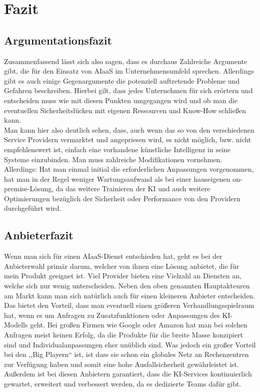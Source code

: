 \newpage
\section{Fazit}
\subsection{Argumentationsfazit}
Zusammenfassend lässt sich also sagen, dass es durchaus Zahlreiche Argumente gibt, die für den Einsatz von AIaaS im Unternehmensumfeld sprechen. Allerdings gibt es auch einige Gegenargumente die potenziell auftretende Probleme und Gefahren beschreiben. Hierbei gilt, dass jedes Unternehmen für sich erörtern und entscheiden muss wie mit diesen Punkten umgegangen wird und ob man die eventuellen Sicherheitslücken mit eigenen Ressourcen und Know-How schließen kann. \\
Man kann hier also deutlich sehen, dass, auch wenn das so von den verschiedenen Service Providern vermarktet und angepriesen wird, es nicht möglich, bzw. nicht empfehlenswert ist, einfach eine vorhandene künstliche Intelligenz in seine Systeme einzubinden. Man muss zahlreiche Modifikationen vornehmen. Allerdings: Hat man einmal initial die erforderlichen Anpassungen vorgenommen, hat man in der Regel weniger Wartungsaufwand als bei einer hauseigenen on-premise-Lösung, da das weitere Trainieren der KI und auch weitere Optimierungen bezüglich der Sicherheit oder Performance von den Providern durchgeführt wird. \\

\subsection{Anbieterfazit}
Wenn man sich für einen AIaaS-Dienst entschieden hat, geht es bei der Anbieterwahl primär darum, welcher von ihnen eine Lösung anbietet, die für mein Produkt geeignet ist. Viel Provider bieten eine Vielzahl an Diensten an, welche sich nur wenig unterscheiden. Neben den oben genannten Hauptakteuren am Markt kann man sich natürlich auch für einen kleineren Anbieter entscheiden. Das bietet den Vorteil, dass man eventuell einen größeren Verhandlungsspielraum hat, wenn es um Anfragen zu Zusatzfunktionen oder Anpassungen des KI-Modells geht. Bei großen Firmen wie Google oder Amazon hat man bei solchen Anfragen meist keinen Erfolg, da die Produkte für die breite Masse konzipiert sind und Individualanpassungen eher unüblich sind. Was jedoch ein großer Vorteil bei den ,,Big Playern`` ist, ist dass sie schon ein globales Netz an Rechenzentren zur Verfügung haben und somit eine hohe Ausfallsicherheit gewährleistet ist. Außerdem ist bei diesen Anbietern garantiert, dass die KI-Services kontinuierlich gewartet, erweitert und verbessert werden, da es dedizierte Teams dafür gibt.

